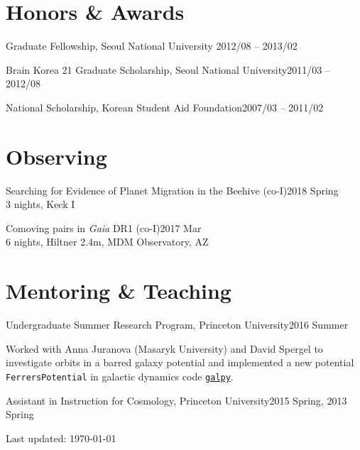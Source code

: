 \documentclass[11pt,letterpaper]{article}
\renewenvironment{itemize}{
  \begin{list}{}{
    \setlength{\leftmargin}{1.em}
  }
}{
  \end{list}
}
\begin{document}
\section*{Honors \& Awards}

\begin{itemize}
  \setlength{\itemsep}{0em}

  \item Graduate Fellowship, Seoul National University \hfill 2012/08 -- 2013/02
  \item Brain Korea 21 Graduate Scholarship, Seoul National University\hfill 2011/03 -- 2012/08
	\item National Scholarship, Korean Student Aid Foundation\hfill 2007/03 -- 2011/02
\end{itemize}

\section*{Observing}
\begin{itemize}
  \item Searching for Evidence of Planet Migration in the Beehive (co-I)\hfill 2018 Spring\\
    3 nights, Keck I
  \item Comoving pairs in {\it Gaia} DR1 (co-I)\hfill 2017 Mar\\
    6 nights, Hiltner 2.4m, MDM Observatory, AZ
\end{itemize}

\section*{Mentoring \& Teaching}

\begin{itemize}
  \setlength\itemsep{0em}
  \item Undergraduate Summer Research Program, Princeton University\hfill 2016 Summer
    \begin{adjustwidth}{15pt}{}
      Worked with Anna Juranova (Masaryk University) and David Spergel to
      investigate orbits in a barred galaxy potential and implemented a new
      potential {\tt FerrersPotential} in galactic dynamics code \href{http://galpy.readthedocs.io/en/latest/}{\tt galpy}.
    \end{adjustwidth}
  \item Assistant in Instruction for Cosmology, Princeton University\hfill 2015 Spring, 2013 Spring
\end{itemize}

\bigskip

\begin{center}
  \begin{footnotesize}
    Last updated: \today \\
  \end{footnotesize}
\end{center}
\end{document}
